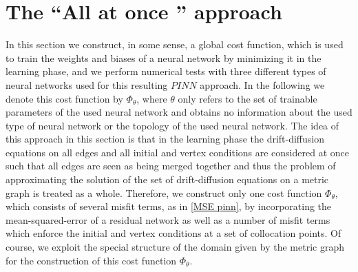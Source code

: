 \section{The “All at once ” approach}
\label{ch3:sec1}

In this section we construct, in some sense, a global cost function, which is used to train the weights and biases of a neural network by minimizing it in the learning phase, and we perform numerical tests with three different types of neural networks used for this resulting $PINN$ approach. In the following we denote this cost function by $\Phi_\theta$, where $\theta$ only refers to the set of trainable parameters of the used neural network and obtains no information about the used type of neural network or the topology of the used neural network. The idea of this approach in this section is that in the learning phase the drift-diffusion equations on all edges and all initial and vertex conditions are considered at once such that all edges are seen as being merged together and thus the problem of approximating the solution of the set of drift-diffusion equations on a metric graph is treated as a whole. Therefore, we construct only one cost function $\Phi_\theta$, which consists of several misfit terms, as in \cref{MSE pinn}, by incorporating the mean-squared-error of a residual network as well as a number of misfit terms which enforce the initial and vertex conditions at a set of collocation points. Of course, we exploit the special structure of the domain given by the metric graph for the construction of this cost function $\Phi_\theta$. \\

